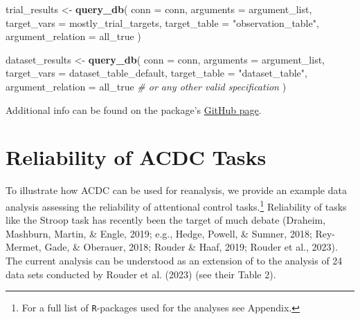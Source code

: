 \documentclass[
  man,floatsintext]{apa6}
\newenvironment{Shaded}{\begin{snugshade}}{\end{snugshade}}
\newcommand{\AttributeTok}[1]{\textcolor[rgb]{0.13,0.29,0.53}{#1}}
\newcommand{\CommentTok}[1]{\textcolor[rgb]{0.56,0.35,0.01}{\textit{#1}}}
\newcommand{\FunctionTok}[1]{\textcolor[rgb]{0.13,0.29,0.53}{\textbf{#1}}}
\newcommand{\NormalTok}[1]{#1}
\newcommand{\OtherTok}[1]{\textcolor[rgb]{0.56,0.35,0.01}{#1}}
\newcommand{\StringTok}[1]{\textcolor[rgb]{0.31,0.60,0.02}{#1}}
\begin{document}
\begin{Shaded}
\begin{Highlighting}[]
\NormalTok{trial\_results }\OtherTok{\textless{}{-}} \FunctionTok{query\_db}\NormalTok{(}
  \AttributeTok{conn =}\NormalTok{ conn,}
  \AttributeTok{arguments =}\NormalTok{ argument\_list,}
  \AttributeTok{target\_vars =}\NormalTok{ mostly\_trial\_targets,}
  \AttributeTok{target\_table =} \StringTok{"observation\_table"}\NormalTok{,}
  \AttributeTok{argument\_relation =}\NormalTok{ all\_true}
\NormalTok{)}

\NormalTok{dataset\_results }\OtherTok{\textless{}{-}} \FunctionTok{query\_db}\NormalTok{(}
  \AttributeTok{conn =}\NormalTok{ conn,}
  \AttributeTok{arguments =}\NormalTok{ argument\_list,}
  \AttributeTok{target\_vars =}\NormalTok{ dataset\_table\_default, }
  \AttributeTok{target\_table =} \StringTok{"dataset\_table"}\NormalTok{,}
  \AttributeTok{argument\_relation =}\NormalTok{ all\_true }\CommentTok{\# or any other valid specification}
\NormalTok{)}
\end{Highlighting}
\end{Shaded}

Additional info can be found on the package's \href{https://github.com/SLesche/acdc-query}{GitHub page}.

\hypertarget{reliability-of-acdc-tasks}{%
\section{Reliability of ACDC Tasks}\label{reliability-of-acdc-tasks}}

To illustrate how ACDC can be used for reanalysis, we provide an example data analysis assessing the reliability of attentional control tasks.\footnote{For a full list of \texttt{R}-packages used for the analyses see Appendix.} Reliability of tasks like the Stroop task has recently been the target of much debate (Draheim, Mashburn, Martin, \& Engle, 2019; e.g., Hedge, Powell, \& Sumner, 2018; Rey-Mermet, Gade, \& Oberauer, 2018; Rouder \& Haaf, 2019; Rouder et al., 2023). The current analysis can be understood as an extension of to the analysis of 24 data sets conducted by Rouder et al. (2023) (see their Table 2).
\end{document}
